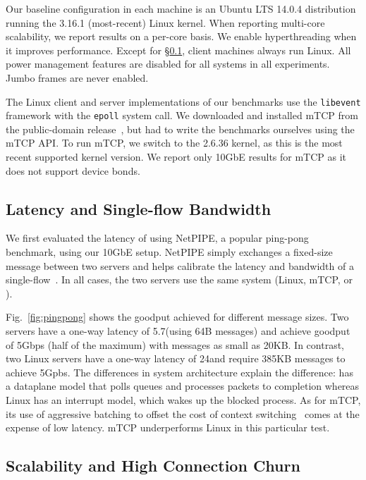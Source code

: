 Our baseline configuration in each
machine is an Ubuntu LTS 14.0.4 distribution running the 3.16.1 (most-recent) Linux kernel.
When reporting multi-core scalability, we report
results on a per-core basis. We enable hyperthreading when it improves performance. Except for
\S\ref{sec:eval:netpipe}, client machines always run Linux. All power
management features are disabled for all systems in all
experiments. Jumbo frames are never enabled.


The Linux client and server implementations of our benchmarks use the
\texttt{libevent} framework with the \texttt{epoll} system call.  We
downloaded and installed mTCP from the public-domain
release~\cite{url:mtcp}, but had to write the benchmarks ourselves
using the mTCP API.  To run mTCP, we switch to the 2.6.36 kernel, as
this is the most recent supported kernel version.  We report only
10GbE results for mTCP as it does not support device bonds.


\subsection{Latency and Single-flow Bandwidth}
\label{sec:eval:netpipe}

We first evaluated the latency of \ix using NetPIPE, a popular
ping-pong benchmark, using our 10GbE setup.  NetPIPE simply exchanges
a fixed-size message between two servers and helps calibrate the
latency and bandwidth of a single-flow~\cite{snell1996netpipe}.  In
all cases, the two servers use the same system (Linux, mTCP, or \ix).


Fig.~\ref{fig:pingpong} shows the goodput achieved for different
message sizes.  Two \ix servers have a one-way latency of
5.7\microsecond (using 64B messages) and achieve goodput of 5Gbps
(half of the maximum) with messages as small as 20KB. In contrast, two
Linux servers have a one-way latency of 24\microsecond and require
385KB messages to achieve 5Gpbs.  The differences in system
architecture explain the difference: \ix has a dataplane model that
polls queues and processes packets to completion whereas Linux has an
interrupt model, which wakes up the blocked process.  
As for mTCP, its use of aggressive batching to offset the cost of
context switching~\cite{jeong2014mtcp} comes at the expense of low
latency. mTCP underperforms Linux in this particular test.




\subsection{Scalability and High Connection Churn}
\label{sec:eval:short}



